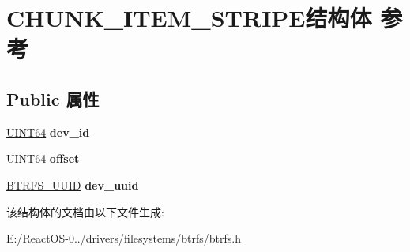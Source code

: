 \hypertarget{struct_c_h_u_n_k___i_t_e_m___s_t_r_i_p_e}{}\section{C\+H\+U\+N\+K\+\_\+\+I\+T\+E\+M\+\_\+\+S\+T\+R\+I\+P\+E结构体 参考}
\label{struct_c_h_u_n_k___i_t_e_m___s_t_r_i_p_e}
\subsection*{Public 属性}
\begin{DoxyCompactItemize}
\item 
\mbox{\label{struct_c_h_u_n_k___i_t_e_m___s_t_r_i_p_e_a7281a16c7527a6a9588d97952a33c7ab}} 
\hyperlink{_processor_bind_8h_a57be03562867144161c1bfee95ca8f7c}{U\+I\+N\+T64} {\bfseries dev\+\_\+id}
\item 
\mbox{\label{struct_c_h_u_n_k___i_t_e_m___s_t_r_i_p_e_a64c31599410c38cf9e2ae9ca44a38e77}} 
\hyperlink{_processor_bind_8h_a57be03562867144161c1bfee95ca8f7c}{U\+I\+N\+T64} {\bfseries offset}
\item 
\mbox{\label{struct_c_h_u_n_k___i_t_e_m___s_t_r_i_p_e_a042dcf01f6dc300be5428968024b417f}} 
\hyperlink{struct_b_t_r_f_s___u_u_i_d}{B\+T\+R\+F\+S\+\_\+\+U\+U\+ID} {\bfseries dev\+\_\+uuid}
\end{DoxyCompactItemize}


该结构体的文档由以下文件生成\+:\begin{DoxyCompactItemize}
\item 
E\+:/\+React\+O\+S-\/0../drivers/filesystems/btrfs/btrfs.\+h\end{DoxyCompactItemize}
